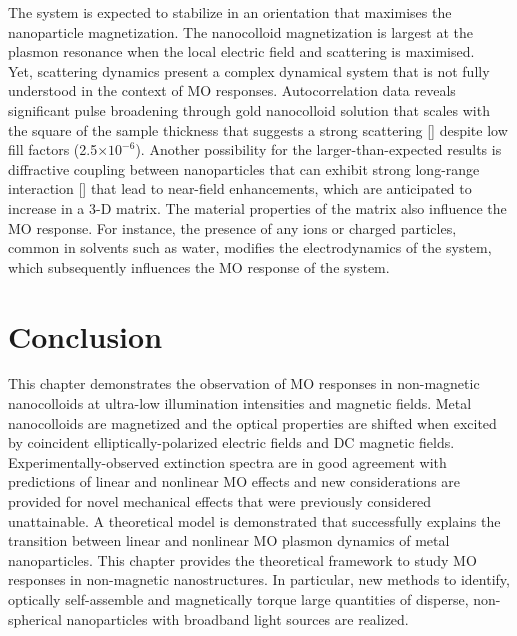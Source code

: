 The system is expected to stabilize in an orientation that maximises the nanoparticle magnetization. The nanocolloid magnetization is largest at the plasmon resonance when the local electric field and scattering is maximised.
\\\indent Yet, scattering dynamics present a complex dynamical system that is not fully understood in the context of MO responses. Autocorrelation data reveals significant pulse broadening through gold nanocolloid solution that scales with the square of the sample thickness that suggests a strong scattering [\cite{Genack}] despite low fill factors (2.5$\times 10^{-6}$). 
Another possibility for the larger-than-expected results is diffractive coupling between nanoparticles that can exhibit strong long-range interaction [\cite{Barnes2}] that lead to near-field enhancements, which are anticipated to increase in a 3-D matrix. The material properties of the matrix also influence the MO response. For instance, the presence of any ions or charged particles, common in solvents such as water, modifies the electrodynamics of the system, which subsequently influences the MO response of the system.
\section{Conclusion}
\indent This chapter demonstrates the observation of MO responses in non-magnetic nanocolloids at ultra-low illumination intensities and magnetic fields. Metal nanocolloids are magnetized and the optical properties are shifted when excited by coincident elliptically-polarized electric fields and DC magnetic fields. Experimentally-observed extinction spectra are in good agreement with predictions of linear and nonlinear MO effects and new considerations are provided for novel mechanical effects that were previously considered unattainable. A theoretical model is demonstrated that successfully explains the transition between linear and nonlinear MO plasmon dynamics of metal nanoparticles. This chapter provides the theoretical framework to study MO responses in non-magnetic nanostructures. In particular, new methods to identify, optically self-assemble and magnetically torque large quantities of disperse, non-spherical nanoparticles with broadband light sources are realized.

